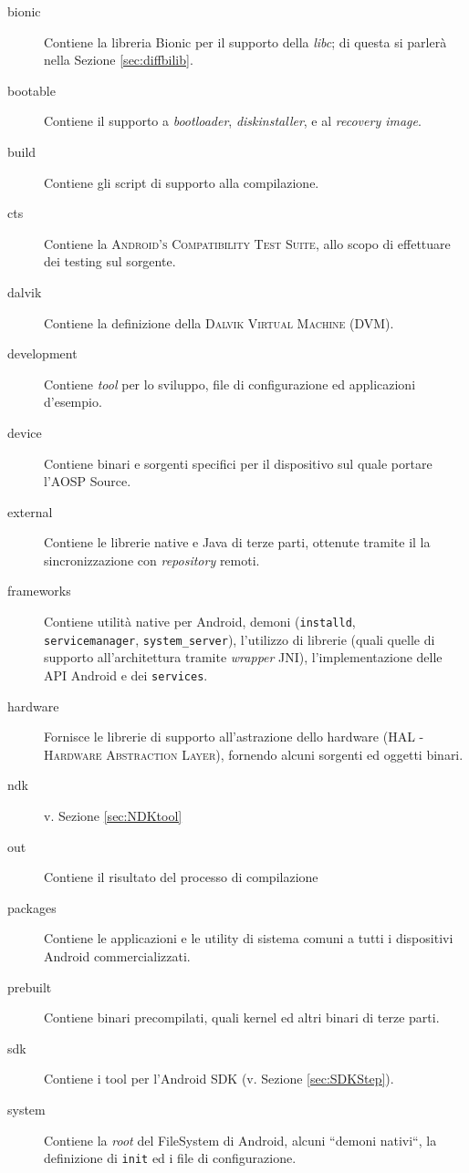 \begin{description}
\item[bionic] Contiene la libreria Bionic per il supporto della \textit{libc}; di questa si parlerà nella Sezione \vref{sec:diffbilib}.
\item[bootable] Contiene il supporto a \textit{bootloader}, \textit{diskinstaller}, e al \textit{recovery image}.
\item[build] Contiene gli script di supporto alla compilazione.
\item[cts] Contiene la  \textsc{Android’s Compatibility Test Suite}, allo scopo di effettuare dei testing sul sorgente.
\item[dalvik] Contiene la definizione della \textsc{Dalvik Virtual Machine} (DVM).
\item[development] Contiene \textit{tool} per lo sviluppo, file di configurazione ed applicazioni d'esempio.
\item[device] Contiene binari e sorgenti specifici per il dispositivo sul quale portare l'AOSP Source.
\item[external] Contiene le librerie native e Java di terze parti, ottenute tramite il la sincronizzazione con \textit{repository} remoti.
\item[frameworks] \label{sec:explainframe} Contiene utilità native per Android, demoni (\texttt {installd}, \\
\texttt{servicemanager}, \texttt{system\_server}), l'utilizzo di librerie (quali quelle di supporto all'architettura tramite \textit{wrapper} JNI), l'implementazione delle API Android e dei \texttt{services}. 
\item[hardware] Fornisce le librerie di supporto all'astrazione dello hardware (HAL - \textsc{Hardware Abstraction Layer}), fornendo alcuni sorgenti ed oggetti binari.
\item[ndk] v. Sezione \vref{sec:NDKtool}
\item[out] Contiene il risultato del processo di compilazione
\item[packages] Contiene le applicazioni e le utility di sistema comuni a tutti i dispositivi Android commercializzati.
\item[prebuilt] Contiene binari precompilati, quali kernel ed altri binari di terze parti.
\item[sdk] Contiene i tool per l'Android SDK (v. Sezione \vref{sec:SDKStep}).
\item[system] Contiene la \textit{root} del FileSystem di Android, alcuni ``demoni nativi``, la definizione di \texttt{\small init} ed i file di configurazione.    
\end{description}

